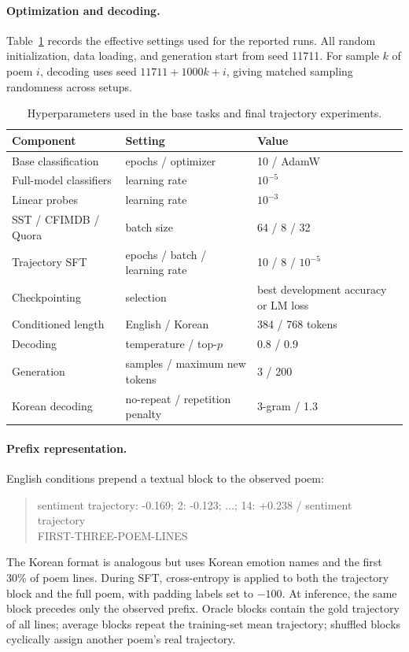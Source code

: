 \documentclass{article}
\begin{document}
\paragraph{Optimization and decoding.}
Table~\ref{tab:hyperparameters} records the effective settings used for the reported runs. All random initialization, data loading, and generation start from seed 11711. For sample $k$ of poem $i$, decoding uses seed $11711+1000k+i$, giving matched sampling randomness across setups.

\begin{table}[h!]
\caption{Hyperparameters used in the base tasks and final trajectory experiments.}
\label{tab:hyperparameters}
\centering
\scriptsize
\setlength{\tabcolsep}{4pt}
\begin{tabular}{lll}
\toprule
Component & Setting & Value \\
\midrule
Base classification & epochs / optimizer & 10 / AdamW \\
Full-model classifiers & learning rate & $10^{-5}$ \\
Linear probes & learning rate & $10^{-3}$ \\
SST / CFIMDB / Quora & batch size & 64 / 8 / 32 \\
Trajectory SFT & epochs / batch / learning rate & 10 / 8 / $10^{-5}$ \\
Checkpointing & selection & best development accuracy or LM loss \\
Conditioned length & English / Korean & 384 / 768 tokens \\
Decoding & temperature / top-$p$ & 0.8 / 0.9 \\
Generation & samples / maximum new tokens & 3 / 200 \\
Korean decoding & no-repeat / repetition penalty & 3-gram / 1.3 \\
\bottomrule
\end{tabular}
\end{table}

\paragraph{Prefix representation.}
English conditions prepend a textual block to the observed poem:
\begin{quote}\small\ttfamily
\lbrack sentiment trajectory\rbrack{}: -0.169; 2: -0.123; $\ldots$; 14: +0.238\quad
\lbrack/ sentiment trajectory\rbrack\\
FIRST-THREE-POEM-LINES
\end{quote}
The Korean format is analogous but uses Korean emotion names and the first 30\% of poem lines. During SFT, cross-entropy is applied to both the trajectory block and the full poem, with padding labels set to $-100$. At inference, the same block precedes only the observed prefix. Oracle blocks contain the gold trajectory of all lines; average blocks repeat the training-set mean trajectory; shuffled blocks cyclically assign another poem's real trajectory.
\end{document}
